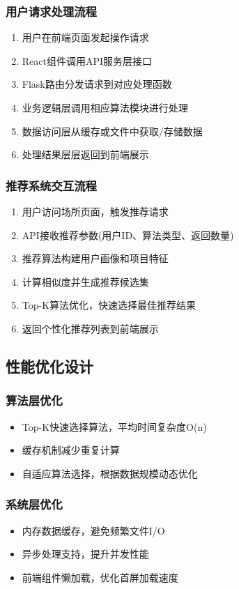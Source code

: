 \documentclass[12pt,a4paper]{article}
\begin{document}
\subsubsection{用户请求处理流程}
\begin{enumerate}
    \item 用户在前端页面发起操作请求
    \item React组件调用API服务层接口
    \item Flask路由分发请求到对应处理函数
    \item 业务逻辑层调用相应算法模块进行处理
    \item 数据访问层从缓存或文件中获取/存储数据
    \item 处理结果层层返回到前端展示
\end{enumerate}

\subsubsection{推荐系统交互流程}
\begin{enumerate}
    \item 用户访问场所页面，触发推荐请求
    \item API接收推荐参数(用户ID、算法类型、返回数量)
    \item 推荐算法构建用户画像和项目特征
    \item 计算相似度并生成推荐候选集
    \item Top-K算法优化，快速选择最佳推荐结果
    \item 返回个性化推荐列表到前端展示
\end{enumerate}

\subsection{性能优化设计}

\subsubsection{算法层优化}
\begin{itemize}
    \item Top-K快速选择算法，平均时间复杂度O(n)
    \item 缓存机制减少重复计算
    \item 自适应算法选择，根据数据规模动态优化
\end{itemize}

\subsubsection{系统层优化}
\begin{itemize}
    \item 内存数据缓存，避免频繁文件I/O
    \item 异步处理支持，提升并发性能
    \item 前端组件懒加载，优化首屏加载速度
\end{itemize}
\end{document}
